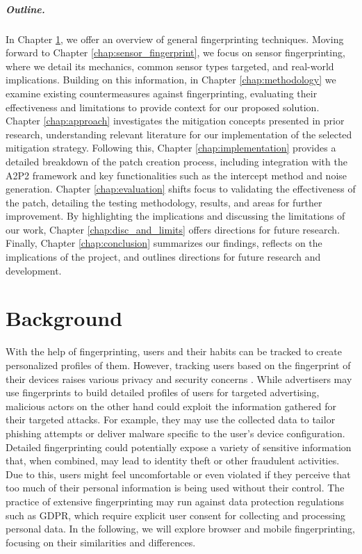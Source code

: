 \documentclass[11pt,
  oneside,openany,    %
]{scrreprt}
\begin{document}
\paragraph{Outline.}
In Chapter \ref{chap:background}, we offer an overview of general fingerprinting techniques. 
Moving forward to Chapter \ref{chap:sensor_fingerprint}, we focus on sensor fingerprinting, where we detail its mechanics, common sensor types targeted, and real-world implications.
Building on this information, in Chapter \ref{chap:methodology} we examine existing countermeasures against fingerprinting, evaluating their effectiveness and limitations to provide context for our proposed solution. 
Chapter \ref{chap:approach} investigates the mitigation concepts presented in prior research, understanding relevant literature for our implementation of the selected mitigation strategy.
Following this, Chapter \ref{chap:implementation} provides a detailed breakdown of the patch creation process, including integration with the A2P2 framework and key functionalities such as the intercept method and noise generation. 
Chapter \ref{chap:evaluation} shifts focus to validating the effectiveness of the patch, detailing the testing methodology, results, and areas for further improvement. 
By highlighting the implications and discussing the limitations of our work, Chapter \ref{chap:disc_and_limits} offers directions for future research.
Finally, Chapter \ref{chap:conclusion} summarizes our findings, reflects on the implications of the project, and outlines directions for future research and development.


\chapter{Background}
\label{chap:background}
With the help of fingerprinting, users and their habits can be tracked to create personalized profiles of them.
However, tracking users based on the fingerprint of their devices raises various privacy and security concerns \cite{DBLP:conf/ndss/MengZXZZBLTD23}.
While advertisers may use fingerprints to build detailed profiles of users for targeted advertising, malicious actors on the other hand could exploit the information gathered for their targeted attacks. 
For example, they may use the collected data to tailor phishing attempts or deliver malware specific to the user's device configuration.
Detailed fingerprinting could potentially expose a variety of sensitive information that, when combined, may lead to identity theft or other fraudulent activities.
Due to this, users might feel uncomfortable or even violated if they perceive that too much of their personal information is being used without their control.
The practice of extensive fingerprinting may run against data protection regulations such as GDPR, which require explicit user consent for collecting and processing personal data.
In the following, we will explore browser and mobile fingerprinting, focusing on their similarities and differences.
\end{document}

